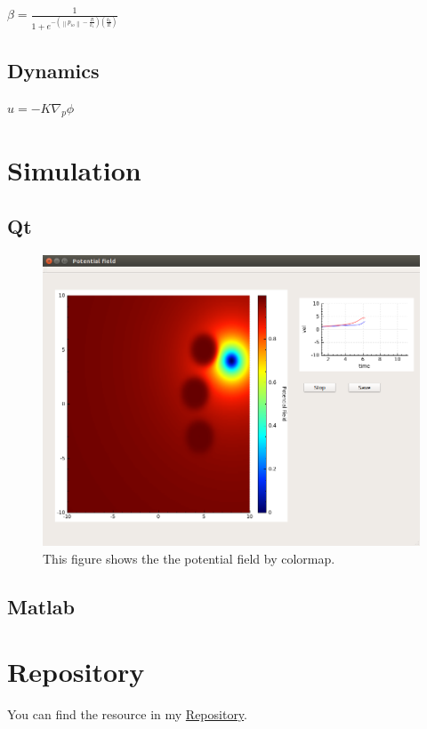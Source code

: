 \documentclass[a4paper]{article}
\begin{document}
{\Large $\beta =\frac { 1 }{ 1+{ e }^{ -\left( \left\| { p }_{ io } \right\| -\frac { R }{ { k }_{ 1 } }  \right) \left( \frac { { k }_{ 2 } }{ R }  \right)  } } $}

\subsection{Dynamics}

{\Large $u=-K{ \nabla  }_{ p }\phi $}


\section{Simulation}


\subsection{Qt}

\begin{figure}
\centering
\includegraphics[width=1\textwidth]{colormap.png}
\caption{\label{fig:Colormap}This figure shows the the potential field by colormap.}
\end{figure}

\subsection{Matlab}


\section{Repository}

You can find the resource in my \href{https://github.com/EdXian/Potential-Field-Navigation-Function}{Repository}.



\end{document}
